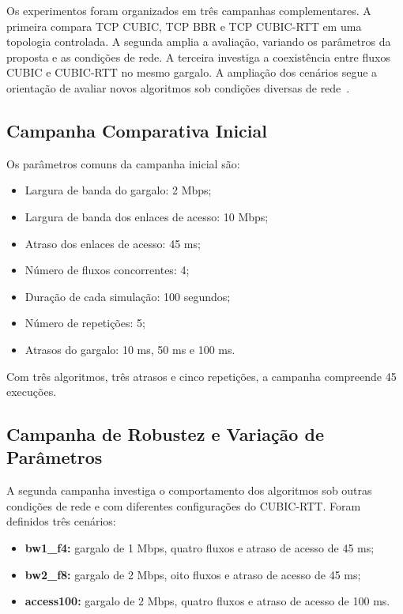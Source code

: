 Os experimentos foram organizados em três campanhas complementares. A primeira compara TCP CUBIC, TCP BBR e TCP CUBIC-RTT em uma topologia controlada. A segunda amplia a avaliação, variando os parâmetros da proposta e as condições de rede. A terceira investiga a coexistência entre fluxos CUBIC e CUBIC-RTT no mesmo gargalo. A ampliação dos cenários segue a orientação de avaliar novos algoritmos sob condições diversas de rede~\cite{rfc9743}.

\subsection{Campanha Comparativa Inicial}

Os parâmetros comuns da campanha inicial são:

\begin{itemize}
    \item Largura de banda do gargalo: 2 Mbps;
    \item Largura de banda dos enlaces de acesso: 10 Mbps;
    \item Atraso dos enlaces de acesso: 45 ms;
    \item Número de fluxos concorrentes: 4;
    \item Duração de cada simulação: 100 segundos;
    \item Número de repetições: 5;
    \item Atrasos do gargalo: 10 ms, 50 ms e 100 ms.
\end{itemize}

Com três algoritmos, três atrasos e cinco repetições, a campanha compreende 45 execuções.

\subsection{Campanha de Robustez e Variação de Parâmetros}
\label{sec:robustez}

A segunda campanha investiga o comportamento dos algoritmos sob outras condições de rede e com diferentes configurações do CUBIC-RTT. Foram definidos três cenários:

\begin{itemize}
    \item \textbf{bw1\_f4:} gargalo de 1 Mbps, quatro fluxos e atraso de acesso de 45 ms;
    \item \textbf{bw2\_f8:} gargalo de 2 Mbps, oito fluxos e atraso de acesso de 45 ms;
    \item \textbf{access100:} gargalo de 2 Mbps, quatro fluxos e atraso de acesso de 100 ms.
\end{itemize}

